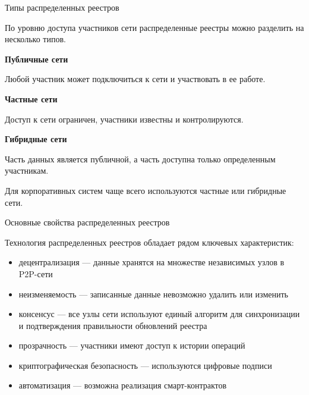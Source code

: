 \documentclass[aspectratio=169]{beamer}
\begin{document}

\begin{frame}{Типы распределенных реестров}

По уровню доступа участников сети распределенные реестры можно разделить на несколько типов.

\textbf{Публичные сети}

Любой участник может подключиться к сети и участвовать в ее работе.

\textbf{Частные сети}

Доступ к сети ограничен, участники известны и контролируются.

\textbf{Гибридные сети}

Часть данных является публичной, а часть доступна только определенным участникам.

Для корпоративных систем чаще всего используются частные или гибридные сети.

\end{frame}


\begin{frame}{Основные свойства распределенных реестров}

Технология распределенных реестров обладает рядом ключевых характеристик:

\begin{itemize}
\item децентрализация — данные хранятся на множестве независимых узлов в P2P-сети
\item неизменяемость — записанные данные невозможно удалить или изменить
\item консенсус — все узлы сети используют единый алгоритм для синхронизации и подтверждения правильности обновлений реестра
\item прозрачность — участники имеют доступ к истории операций
\item криптографическая безопасность — используются цифровые подписи
\item автоматизация — возможна реализация смарт-контрактов
\end{itemize}

\end{frame}

\end{document}

